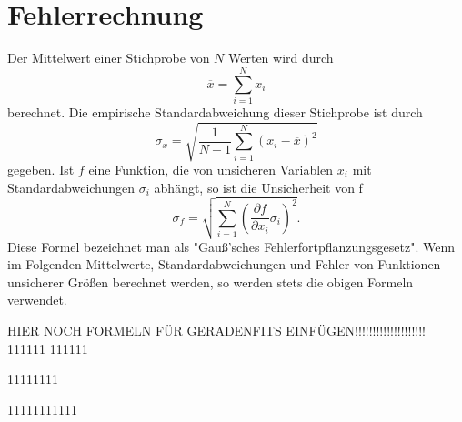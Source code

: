 \section{Fehlerrechnung}
Der Mittelwert einer Stichprobe von $N$ Werten wird durch
\begin{equation}
  \overline{x} = \sum\limits_{i = 1}^N x_i
\end{equation}
\label{eqn:mean}
berechnet.
Die empirische Standardabweichung dieser Stichprobe ist durch
\begin{equation}
  \sigma_x = \sqrt{\frac{1}{N-1}
    \sum\limits_{i = 1}^N
    (x_i-\overline{x})^2}
\end{equation}
\label{eqn:std}
gegeben.
Ist $f$ eine Funktion, die von unsicheren Variablen $x_i$ mit
Standardabweichungen $\sigma_i$ abhängt, so ist die Unsicherheit von f
\begin{equation}
  \sigma_f = \sqrt{
    \sum\limits_{i = 1}^N
      \left( \frac{\partial f}{\partial x_i} \sigma_i \right)^{\!\! 2}
  }.
\end{equation}
\label{eqn:gaussfehler}
Diese Formel bezeichnet man als "Gauß'sches Fehlerfortpflanzungsgesetz".
Wenn im Folgenden Mittelwerte, Standardabweichungen und Fehler von
Funktionen unsicherer Größen berechnet werden, so werden stets die obigen
Formeln verwendet.

HIER NOCH FORMELN FÜR GERADENFITS EINFÜGEN!!!!!!!!!!!!!!!!!!!!
111111
111111



11111111







11111111111
\label{sec:Fehlerrechnung}
